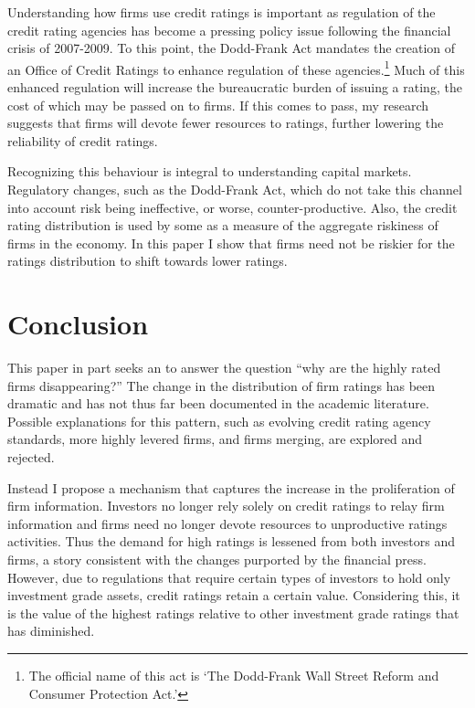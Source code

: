 \documentclass[notitlepage]{article}
\begin{document}
Understanding how firms use credit ratings is important as regulation of the credit rating agencies has become a pressing policy issue following the financial crisis of 2007-2009. To this point, the Dodd-Frank Act mandates the creation of an Office of Credit Ratings to enhance regulation of these agencies.\footnote{The official name of this act is `The Dodd-Frank Wall Street Reform and Consumer Protection Act.'} Much of this enhanced regulation will increase the bureaucratic burden of issuing a rating, the cost of which may be passed on to firms. If this comes to pass, my research suggests that firms will devote fewer resources to ratings, further lowering the reliability of credit ratings. 

Recognizing this behaviour is integral to understanding capital markets. Regulatory changes, such as the Dodd-Frank Act, which do not take this channel into account risk being ineffective, or worse, counter-productive. Also, the credit rating distribution is used by some as a measure of the aggregate riskiness of firms in the economy. In this paper I show that firms need not be riskier for the ratings distribution to shift towards lower ratings.

\section{Conclusion}
\label{sec:con}
This paper in part seeks an to answer the question ``why are the highly rated firms disappearing?'' The change in the distribution of firm ratings has been dramatic and has not thus far been documented in the academic literature. Possible explanations for this pattern, such as evolving credit rating agency standards, more highly levered firms, and firms merging, are explored and rejected. 

Instead I propose a mechanism that captures the increase in the proliferation of firm information. Investors no longer rely solely on credit ratings to relay firm information and firms need no longer devote resources to unproductive ratings activities. Thus the demand for high ratings is lessened from both investors and firms, a story consistent with the changes purported by the financial press. However, due to regulations that require certain types of investors to hold only investment grade assets, credit ratings retain a certain value. Considering this, it is the value of the highest ratings relative to other investment grade ratings that has diminished.

\newpage
\end{document}
